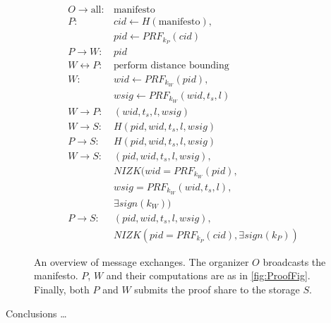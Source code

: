 \begin{columns}[t]
\begin{column}{0.32\linewidth}
    \begin{figure}
      \centering
      \begin{minipage}{\linewidth}
        \begin{align*}
          O\to \text{all}\colon & \text{manifesto} \\
          P\colon & cid\gets H(\text{manifesto}), \\
          & pid\gets PRF_{k_P}(cid) \\
          P\to W\colon & pid \\
          W\leftrightarrow P\colon & \text{perform distance bounding} \\
          W\colon & wid\gets PRF_{k_W}(pid), \\
          & wsig\gets PRF_{k_W}(wid, t_s, l) \\
          W\to P\colon & (wid, t_s, l, wsig) \\
          W\to S\colon & H(pid, wid, t_s, l, wsig) \\
          P\to S\colon & H(pid, wid, t_s, l, wsig) \\
          W\to S\colon & (pid, wid, t_s, l, wsig),\\
          & NIZK(wid = PRF_{k_W}(pid), \\
            & wsig = PRF_{k_W}(wid, t_s, l), \\
            & \exists sign(k_W)) \\
          P\to S\colon & (pid, wid, t_s, l, wsig),\\
          & NIZK(pid = PRF_{k_P}(cid), \exists sign(k_P))
        \end{align*}
      \end{minipage}
      \caption{%
        An overview of message exchanges.
        The organizer \(O\) broadcasts the manifesto.
        \(P\), \(W\) and their computations are as in \cref{fig:ProofFig}.
        Finally, both \(P\) and \(W\) submits the proof share to the storage \(S\).
      }%
      \label{fig:ProtocolOverview}
    \end{figure}

    \begin{purpleblock}{Conclusions}
      \dots
    \end{purpleblock}

    \printbibliography[heading=none]

  \end{column}

\end{columns}

